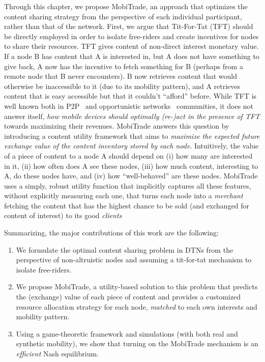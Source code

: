 Through this chapter, we propose MobiTrade, an approach that optimizes the content sharing strategy from the perspective of each individual participant, rather than that of the network. First, we argue that Tit-For-Tat (TFT) should be directly employed in order to isolate free-riders and create incentives for nodes to share their resources. TFT gives content of non-direct interest monetary value. If a node B has content that A is interested in, but A does not have something to give back, A now has the incentive to fetch something for B (perhaps from a remote node that B never encounters). B now retrieves content that would otherwise be inaccessible to it (due to its mobility pattern), and A retrieves content that is easy accessible but that it couldn't ``afford'' before. While TFT is well known both in P2P~\cite{BitHoc} and opportunistic networks~\cite{BarterDTN} communities, it does not answer itself, \emph{how mobile devices should optimally (re-)act in the presence of TFT} towards maximizing their revenues. MobiTrade answers this question by introducing a content utility framework that aims to \emph{maximize the expected future exchange value of the content inventory stored by each node}. Intuitively, the value of a piece of content to a node A should depend on (i) how many are interested in it, (ii) how often does A see these nodes, (iii) how much content, interesting to A, do these nodes have, and (iv) how ``well-behaved'' are these nodes. MobiTrade uses a simply, robust utility function that implicitly captures all these features, without explicitly measuring each one, that turns each node into a \emph{merchant} fetching the content that has the highest chance to be sold (and exchanged for content of interest) to its good \emph{clients}


Summarizing, the major contributions of this work are the following:
\begin{enumerate}
    \item We formulate the optimal content sharing problem in DTNs from the perspective of non-altruistic nodes and assuming a tit-for-tat mechanism to isolate free-riders.
    \item We propose MobiTrade, a utility-based solution to this problem that predicts the (exchange) value of each piece of content and provides a customized resource allocation strategy for each node, \emph{matched} to each own interests and mobility pattern.
    \item Using a game-theoretic framework and simulations (with both real and synthetic mobility), we show that turning on the MobiTrade mechanism is an \emph{efficient} Nash equilibrium.
\end{enumerate}

